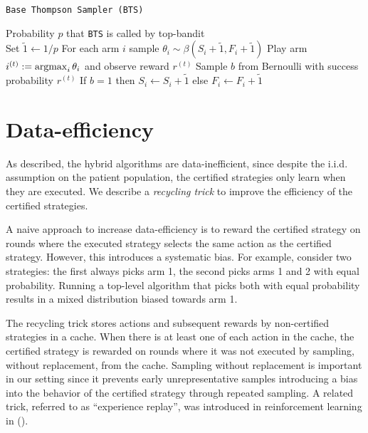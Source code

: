 \begin{algorithm}[tb]
   \caption{\texttt{Base Thompson Sampler (BTS)}}
   \label{alg:bts}
   \begin{algorithmic}
   	 Probability $p$ that \texttt{BTS} is called by top-bandit\\
   	\STATE Set $\tilde{1}\leftarrow 1/p$
   	 \STATE For each arm $i$ sample $\theta_i\sim\beta(S_i +\tilde{1},F_i +\tilde{1})$
	\STATE Play arm $i^{(t)} := \operatorname*{argmax}_i \theta_i$ and observe reward $r^{(t)}$
	\STATE Sample $b$ from Bernoulli with success probability $r^{(t)}$
	\STATE If $b=1$ then $S_i \leftarrow S_i + \tilde{1}$ else $F_i\leftarrow F_i+\tilde{1}$
   	\end{algorithmic}
\end{algorithm}



\section{Data-efficiency}

As described, the hybrid algorithms are data-inefficient, since despite the i.i.d. assumption on the patient population, the certified strategies only learn when they are executed. We describe a \emph{recycling trick} to improve the efficiency of the certified strategies. 

A naive approach to increase data-efficiency is to reward the certified strategy on rounds where the executed strategy selects the same action as the certified strategy. However, this introduces a systematic bias. For example, consider two strategies: the first always picks arm 1, the second picks arms 1 and 2 with equal probability. Running a top-level algorithm that picks both with equal probability results in a mixed distribution biased towards arm 1.

The recycling trick stores actions and subsequent rewards by non-certified strategies in a cache. When there is at least one of each action in the cache, the certified strategy is rewarded on rounds where it was not executed by sampling, without replacement, from the cache. Sampling without replacement is important in our setting since it prevents early unrepresentative samples introducing a bias into the behavior of the certified strategy through repeated sampling. A related trick, referred to as ``experience replay'', was introduced in reinforcement learning in (\cite{Mnih:2015wq}). 

